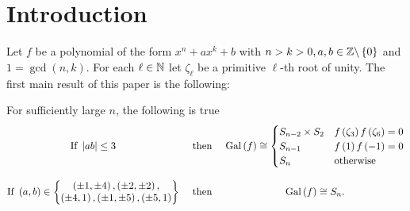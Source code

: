 \documentclass[../main.tex]{subfiles}
\begin{document}
\section{Introduction}
Let $f$ be a polynomial of the form $x^n + a x^k + b$ with $n > k > 0, a, b \in \mathbb{Z} \backslash \left\{ 0 \right\}$ and $1 = \gcd\left( n,k \right)$.
For each $\ell \in \mathbb{N}$ let $\zeta_\ell$ be a primitive $\ell$-th root of unity.
The first main result of this paper is the following:
\begin{theorem}
  \label{thm:main}
  For sufficiently large $n$, the following is true
  \[
    \begin{matrix}
      \text{If }
      \left| ab \right| \leq 3 
    & \text{ then }
      &
      \operatorname{Gal}\left( f \right)
      \cong
      \begin{cases}
        S_{n-2} \times S_2 
        & 
        f\left( \zeta_3 \right)f\left( \zeta_6 \right) = 0 \\
        S_{n-1} 
        & 
        f\left( 1 \right)f\left( -1 \right) = 0 \\
        S_n & \text{otherwise}
      \end{cases}
      \\ \\
      \text{If }
      \left( a,b \right) \in 
      \left\{ 
        \begin{matrix}
        \left( \pm 1, \pm 4 \right),
        \left( \pm 2, \pm 2 \right),
        \\
        \left( \pm 4, 1 \right),
        \left( \pm 1, \pm 5 \right),
        \left( \pm 5, 1 \right)
        \end{matrix}
        \right\} 
      &\text{ then }
      &
      \operatorname{Gal}\left( f \right) \cong S_{n}
      .
    \end{matrix}
  \]
  

\end{theorem}
\end{document}
